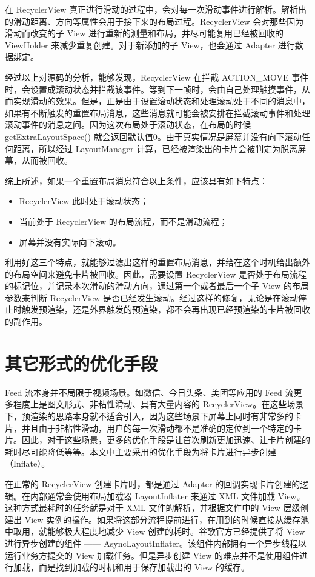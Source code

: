 在 RecyclerView 真正进行滑动的过程中，会对每一次滑动事件进行解析。解析出的滑动距离、方向等属性会用于接下来的布局过程。RecyclerView 会对那些因为滑动而改变的子 View 进行重新的测量和布局，并尽可能复用已经被回收的 ViewHolder 来减少重复创建。对于新添加的子 View，也会通过 Adapter 进行数据绑定。

经过以上对源码的分析，能够发现，RecyclerView 在拦截 ACTION\_MOVE 事件时，会设置成滚动状态并拦截该事件。等到下一帧时，会由自己处理触摸事件，从而实现滑动的效果。但是，正是由于设置滚动状态和处理滚动处于不同的消息中，如果有不断触发的重置布局消息，这些消息就可能会被安排在拦截滚动事件和处理滚动事件的消息之间。因为这次布局处于滚动状态，在布局的时候 getExtraLayoutSpace() 就会返回默认值0。由于真实情况是屏幕并没有向下滚动任何距离，所以经过 LayoutManager 计算，已经被渲染出的卡片会被判定为脱离屏幕，从而被回收。

综上所述，如果一个重置布局消息符合以上条件，应该具有如下特点：

\begin{itemize}
    \item RecyclerView 此时处于滚动状态；
    \item 当前处于 RecyclerView 的布局流程，而不是滑动流程；
    \item 屏幕并没有实际向下滚动。
\end{itemize}

利用好这三个特点，就能够过滤出这样的重置布局消息，并给在这个时机给出额外的布局空间来避免卡片被回收。因此，需要设置 RecyclerView 是否处于布局流程的标记位，并记录本次滑动的滑动方向，通过第一个或者最后一个子 View 的布局参数来判断 RecyclerView 是否已经发生滚动。经过这样的修复，无论是在滚动停止时触发预渲染，还是外界触发的预渲染，都不会再出现已经预渲染的卡片被回收的副作用。

\section{其它形式的优化手段}

Feed 流本身并不局限于视频场景。如微信、今日头条、美团等应用的 Feed 流更多程度上是图文形式、非粘性滑动、具有大量内容的 RecyclerView。在这些场景下，预渲染的思路本身就不适合引入，因为这些场景下屏幕上同时有非常多的卡片，并且由于非粘性滑动，用户的每一次滑动都不是准确的定位到一个特定的卡片。因此，对于这些场景，更多的优化手段是让首次刷新更加迅速、让卡片创建的耗时尽可能降低等等。本文中主要采用的优化手段为将卡片进行异步创建（Inflate）。

在正常的 RecyclerView 创建卡片时，都是通过 Adapter 的回调实现卡片创建的逻辑。在内部通常会使用布局加载器 LayoutInflater 来通过 XML 文件加载 View。这种方式最耗时的任务就是对于 XML 文件的解析，并根据文件中的 View 层级创建出 View 实例的操作。如果将这部分流程提前进行，在用到的时候直接从缓存池中取用，就能够极大程度地减少 View 创建的耗时。谷歌官方已经提供了将 View 进行异步创建的组件 —— AsyncLayoutInflater。该组件内部拥有一个异步线程以运行业务方提交的 View 加载任务。但是异步创建 View 的难点并不是使用组件进行加载，而是找到加载的时机和用于保存加载出的 View 的缓存。

